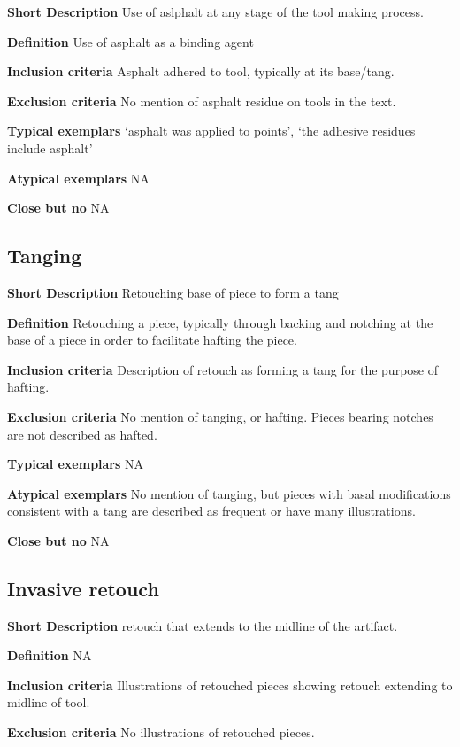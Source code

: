 \documentclass[
]{article}
\begin{document}
\textbf{Short Description} Use of aslphalt at any stage of the tool
making process.

\textbf{Definition} Use of asphalt as a binding agent

\textbf{Inclusion criteria} Asphalt adhered to tool, typically at its
base/tang.

\textbf{Exclusion criteria} No mention of asphalt residue on tools in
the text.

\textbf{Typical exemplars} `asphalt was applied to points', `the
adhesive residues include asphalt'

\textbf{Atypical exemplars} NA

\textbf{Close but no} NA

\hypertarget{tanging}{%
\subsection{Tanging}\label{tanging}}

\textbf{Short Description} Retouching base of piece to form a tang

\textbf{Definition} Retouching a piece, typically through backing and
notching at the base of a piece in order to facilitate hafting the
piece.

\textbf{Inclusion criteria} Description of retouch as forming a tang for
the purpose of hafting.

\textbf{Exclusion criteria} No mention of tanging, or hafting. Pieces
bearing notches are not described as hafted.

\textbf{Typical exemplars} NA

\textbf{Atypical exemplars} No mention of tanging, but pieces with basal
modifications consistent with a tang are described as frequent or have
many illustrations.

\textbf{Close but no} NA

\hypertarget{invasive-retouch}{%
\subsection{Invasive retouch}\label{invasive-retouch}}

\textbf{Short Description} retouch that extends to the midline of the
artifact.

\textbf{Definition} NA

\textbf{Inclusion criteria} Illustrations of retouched pieces showing
retouch extending to midline of tool.

\textbf{Exclusion criteria} No illustrations of retouched pieces.
\end{document}
